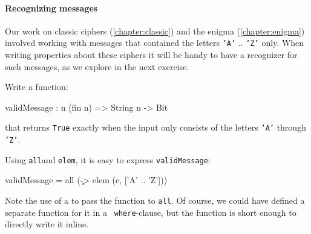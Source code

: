 
\paragraph*{Recognizing messages} Our work on classic ciphers
(\autoref{chapter:classic}) and the enigma
(\autoref{chapter:enigma}) involved working with messages that
contained the letters {\tt 'A'} .. {\tt 'Z'} only. When writing
properties about these ciphers it will be handy to have a recognizer
for such messages, as we explore in the next exercise.

\begin{Exercise}\label{ex:cond:2}
Write a function:
\begin{code}
  validMessage : {n} (fin n) => String n -> Bit
\end{code}
that returns {\tt True} exactly when the input only consists of the
letters {\tt 'A'} through {\tt 'Z'}. 
\end{Exercise}

\begin{Answer}
  Using {\tt all}\indAll and {\tt elem}\indElem, it is easy to express
  {\tt validMessage}:
\begin{code}
  validMessage = all (\c -> elem (c, ['A' .. 'Z']))
\end{code}
Note the use of a \lamex to pass the function to {\tt all}. Of course,
we could have defined a separate function for it in a {\tt
  where}-clause\indWhere, but the function is short enough to directly
write it inline.
\end{Answer}


